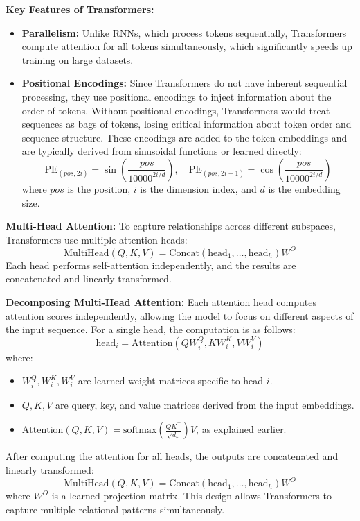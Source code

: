     \textbf{Key Features of Transformers:}
    \begin{itemize}
        \item \textbf{Parallelism:} Unlike RNNs, which process tokens sequentially, Transformers compute attention for all tokens simultaneously, which significantly speeds up training on large datasets.
        \item \textbf{Positional Encodings:} Since Transformers do not have inherent sequential processing, they use positional encodings to inject information about the order of tokens. Without positional encodings, Transformers would treat sequences as bags of tokens, losing critical information about token order and sequence structure. These encodings are added to the token embeddings and are typically derived from sinusoidal functions or learned directly:
        \[
        \text{PE}_{(pos, 2i)} = \sin\left(\frac{pos}{10000^{2i/d}}\right), \quad
        \text{PE}_{(pos, 2i+1)} = \cos\left(\frac{pos}{10000^{2i/d}}\right)
        \]
        where \(pos\) is the position, \(i\) is the dimension index, and \(d\) is the embedding size.
    \end{itemize}

    \textbf{Multi-Head Attention:} To capture relationships across different subspaces, Transformers use multiple attention heads:
    \[
    \text{MultiHead}(Q, K, V) = \text{Concat}(\text{head}_1, \dots, \text{head}_h)W^O
    \]
    Each head performs self-attention independently, and the results are concatenated and linearly transformed. 

    \textbf{Decomposing Multi-Head Attention:}
    Each attention head computes attention scores independently, allowing the model to focus on different aspects of the input sequence. For a single head, the computation is as follows:
    \[
    \text{head}_i = \text{Attention}(QW_i^Q, KW_i^K, VW_i^V)
    \]
    where:
    \begin{itemize}
        \item \(W_i^Q, W_i^K, W_i^V\) are learned weight matrices specific to head \(i\).
        \item \(Q, K, V\) are query, key, and value matrices derived from the input embeddings.
        \item \(\text{Attention}(Q, K, V) = \text{softmax}\left(\frac{QK^\top}{\sqrt{d_k}}\right)V\), as explained earlier.
    \end{itemize}
    
    After computing the attention for all heads, the outputs are concatenated and linearly transformed:
    \[
    \text{MultiHead}(Q, K, V) = \text{Concat}(\text{head}_1, \dots, \text{head}_h)W^O
    \]
    where \(W^O\) is a learned projection matrix. This design allows Transformers to capture multiple relational patterns simultaneously. 

